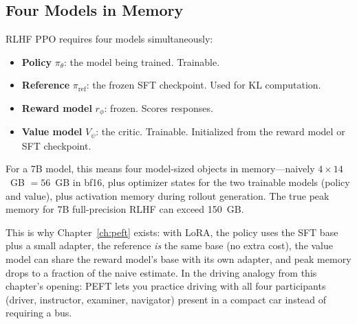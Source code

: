 \subsection{Four Models in Memory}

RLHF PPO requires four models simultaneously:

\begin{itemize}[nosep]
  \item \textbf{Policy} $\pi_\theta$: the model being trained. Trainable.
  \item \textbf{Reference} $\pi_{\text{ref}}$: the frozen SFT checkpoint. Used for KL computation.
  \item \textbf{Reward model} $r_\phi$: frozen. Scores responses.
  \item \textbf{Value model} $V_\psi$: the critic. Trainable. Initialized from the reward model or SFT checkpoint.
\end{itemize}

For a 7B model, this means four model-sized objects in memory---naively $4 \times 14$~GB $= 56$~GB in bf16, plus optimizer states for the two trainable models (policy and value), plus activation memory during rollout generation. The true peak memory for 7B full-precision RLHF can exceed 150~GB.

This is why Chapter~\ref{ch:peft} exists: with LoRA, the policy uses the SFT base plus a small adapter, the reference \emph{is} the same base (no extra cost), the value model can share the reward model's base with its own adapter, and peak memory drops to a fraction of the naive estimate. In the driving analogy from this chapter's opening: PEFT lets you practice driving with all four participants (driver, instructor, examiner, navigator) present in a compact car instead of requiring a bus.

